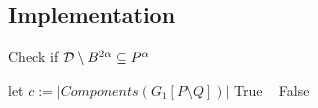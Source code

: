 \subsection{Implementation}

\begin{center}
\begin{minipage}{0.6\textwidth}
    \begin{algorithm}[H]
    	\caption{Check if $\D\setminus B^{2\alpha}\subseteq \kcoverage{P_k^\alpha}\nokcoverage{P^\alpha}$}
    	\label{alg:rips_certify_coverage}
    	\begin{algorithmic}[1]
    			\State let $c := |Components(G_1[P\setminus Q])|$
            \Return True
            \Else ~
            \Return False
    			\EndIf
    		\EndProcedure
    	\end{algorithmic}
    \end{algorithm}
\end{minipage}
\end{center}

%
%
%


